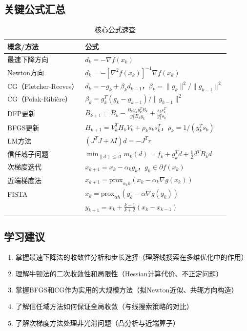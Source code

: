 \subsection{关键公式汇总}

\begin{table}[H]
\centering
\caption{核心公式速查}
\small
\begin{tabular}{@{}lp{9.5cm}@{}}
\toprule
\textbf{概念/方法} & \textbf{公式} \\
\midrule
最速下降方向 & $d_k = -\nabla f(x_k)$ \\
Newton方向 & $d_k = -[\nabla^2 f(x_k)]^{-1} \nabla f(x_k)$ \\
CG（Fletcher-Reeves） & $d_k = -g_k + \beta_k d_{k-1}$，$\beta_k = \|g_k\|^2/\|g_{k-1}\|^2$ \\
CG（Polak-Ribi\`ere） & $\beta_k = g_k^T(g_k-g_{k-1})/\|g_{k-1}\|^2$ \\
DFP更新 & $B_{k+1} = B_k - \frac{B_k y_k y_k^T B_k}{y_k^T B_k y_k} + \frac{s_k s_k^T}{y_k^T s_k}$ \\
BFGS更新 & $H_{k+1} = V_k^T H_k V_k + \rho_k s_k s_k^T$，$\rho_k = 1/(y_k^T s_k)$ \\
LM方法 & $(J^T J + \lambda I) d = -J^T r$ \\
信任域子问题 & $\min_{\|d\|\leq\Delta} m_k(d) = f_k + g_k^T d + \frac{1}{2}d^T B_k d$ \\
次梯度迭代 & $x_{k+1} = x_k - \alpha_k g_k$，$g_k \in \partial f(x_k)$ \\
近端梯度法 & $x_{k+1} = \text{prox}_{\alpha_k h}(x_k - \alpha_k \nabla g(x_k))$ \\
FISTA & $x_k = \text{prox}_{\alpha h}(y_k - \alpha \nabla g(y_k))$ \\
 & $y_{k+1} = x_k + \frac{k-1}{k+2}(x_k - x_{k-1})$ \\
\bottomrule
\end{tabular}
\end{table}

\subsection{学习建议}

\begin{notebox}[学习路径]
\begin{enumerate}[label=\arabic*., leftmargin=2em]
    \item 掌握最速下降法的收敛性分析和步长选择（理解线搜索在多维优化中的作用）
    \item 理解牛顿法的二次收敛性和局限性（Hessian计算代价、不正定问题）
    \item 掌握BFGS和CG作为实用的大规模方法（拟Newton近似、共轭方向构造）
    \item 了解信任域方法如何保证全局收敛（与线搜索策略的对比）
    \item 了解次梯度方法处理非光滑问题（凸分析与近端算子）
\end{enumerate}
\end{notebox}


